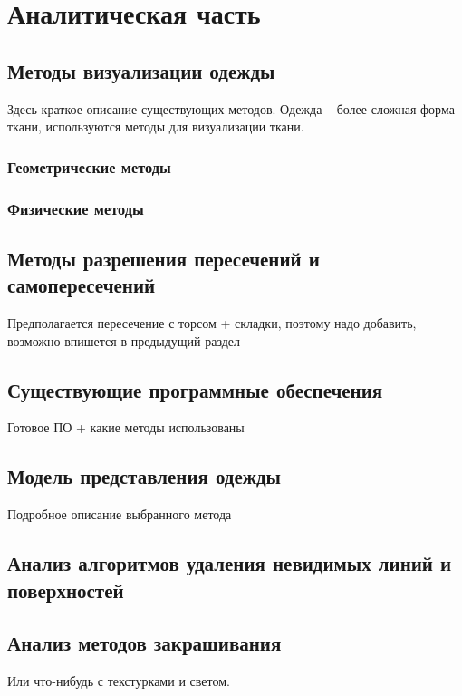 \chapter{Аналитическая часть}

\section{Методы визуализации одежды}

Здесь краткое описание существующих методов.
Одежда -- более сложная форма ткани, используются
методы для визуализации ткани.

\subsection{Геометрические методы}
\subsection{Физические методы}

\section{Методы разрешения пересечений и самопересечений}

Предполагается пересечение с торсом + складки, поэтому надо добавить, возможно впишется в предыдущий раздел

\section{Существующие программные обеспечения}

Готовое ПО + какие методы использованы

\section{Модель представления одежды}

Подробное описание выбранного метода

\section{Анализ алгоритмов удаления невидимых линий и поверхностей}

\section{Анализ методов закрашивания}

Или что-нибудь с текстурками и светом.
